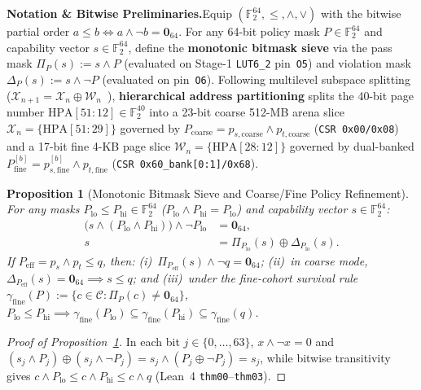 \documentclass[11pt,letterpaper]{article}
\theoremstyle{spectralthm}
\newtheorem{proposition}[theorem]{Proposition}
\begin{document}
\noindent\textbf{Notation \& Bitwise Preliminaries.}\;Equip $(\mathbb{F}_2^{64}, \le, \wedge, \vee)$ with the bitwise partial order $a \le b \iff a \wedge \neg b = \mathbf{0}_{64}$. For any 64-bit policy mask $P \in \mathbb{F}_2^{64}$ and capability vector $s \in \mathbb{F}_2^{64}$, define the \textbf{monotonic bitmask sieve} via the pass mask $\Pi_P(s) := s \wedge P$ (evaluated on Stage-1 \mbox{\texttt{LUT6\_2}} pin~\texttt{O5}) and violation mask $\Delta_P(s) := s \wedge \neg P$ (evaluated on pin~\texttt{O6}). Following multilevel subspace splitting ($\mathcal{X}_{n+1} = \mathcal{X}_n \oplus \mathcal{W}_n$~\cite{chen2001multilevel}), \textbf{hierarchical address partitioning} splits the 40-bit page number $\mathrm{HPA}[51:12] \in \mathbb{F}_2^{40}$ into a 23-bit coarse 512-MB arena slice $\mathcal{X}_n = \{\mathrm{HPA}[51:29]\}$ governed by $P_{\mathrm{coarse}} = p_{s,\mathrm{coarse}} \wedge p_{t,\mathrm{coarse}}$ (\texttt{CSR 0x00/0x08}) and a 17-bit fine 4-KB page slice $\mathcal{W}_n = \{\mathrm{HPA}[28:12]\}$ governed by dual-banked $P_{\mathrm{fine}}^{[b]} = p_{s,\mathrm{fine}}^{[b]} \wedge p_{t,\mathrm{fine}}$ (\texttt{CSR 0x60\_bank[0:1]/0x68}).

\begin{proposition}[Monotonic Bitmask Sieve and Coarse/Fine Policy Refinement]
\label{prop:monotonic}
For any masks $P_{\mathrm{lo}} \le P_{\mathrm{hi}} \in \mathbb{F}_2^{64}$ ($P_{\mathrm{lo}} \wedge P_{\mathrm{hi}} = P_{\mathrm{lo}}$) and capability vector $s \in \mathbb{F}_2^{64}$:
\begin{equation}
\label{eq:monotonic}
\begin{aligned}
\bigl(s \wedge (P_{\mathrm{lo}} \wedge P_{\mathrm{hi}})\bigr) \wedge \neg P_{\mathrm{lo}} &= \mathbf{0}_{64},\\
s &= \Pi_{P_{\mathrm{lo}}}(s) \oplus \Delta_{P_{\mathrm{lo}}}(s).
\end{aligned}
\end{equation}
If $P_{\mathrm{eff}} = p_s \wedge p_t \le q$, then: (i)~$\Pi_{P_{\mathrm{eff}}}(s) \wedge \neg q = \mathbf{0}_{64}$; (ii)~in coarse mode, $\Delta_{P_{\mathrm{eff}}}(s) = \mathbf{0}_{64} \implies s \le q$; and (iii)~under the fine-cohort survival rule $\gamma_{\mathrm{fine}}(P) := \{c \in \mathcal{C} : \Pi_P(c) \neq \mathbf{0}_{64}\}$, $P_{\mathrm{lo}} \le P_{\mathrm{hi}} \implies \gamma_{\mathrm{fine}}(P_{\mathrm{lo}}) \subseteq \gamma_{\mathrm{fine}}(P_{\mathrm{hi}}) \subseteq \gamma_{\mathrm{fine}}(q)$.
\end{proposition}
\begin{proof}[Proof of Proposition~\ref{prop:monotonic}]
In each bit $j \in \{0,\ldots,63\}$, $x \wedge \neg x = 0$ and $(s_j \wedge P_j) \oplus (s_j \wedge \neg P_j) = s_j \wedge (P_j \oplus \neg P_j) = s_j$, while bitwise transitivity gives $c \wedge P_{\mathrm{lo}} \le c \wedge P_{\mathrm{hi}} \le c \wedge q$ (Lean~4 \texttt{thm00}--\texttt{thm03}).
\end{proof}
\end{document}
